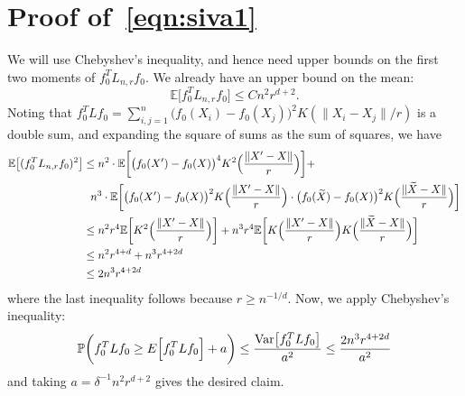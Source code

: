 \documentclass{article}
\newcommand{\Var}{\mathrm{Var}}
\newcommand{\1}{\mathbf{1}}
\newcommand{\Lap}{L}
\newcommand{\Pbb}{\mathbb{P}}
\newcommand{\Ebb}{\mathbb{E}}
\newcommand{\wt}[1]{\widetilde{#1}}
\theoremstyle{definition}
\theoremstyle{remark}
\begin{document}
\section{Proof of~\eqref{eqn:siva1}}
We will use Chebyshev's inequality, and hence need upper bounds on the first two moments of $f_0^T \Lap_{n,r} f_0$. We already have an upper bound on the mean:
\begin{equation*}
\Ebb\bigl[f_0^T \Lap_{n,r} f_0] \leq C n^2 r^{d + 2}.
\end{equation*}
Noting that $f_0^T \Lap f_0 = \sum_{i,j = 1}^{n} \bigl(f_0(X_i) - f_0(X_j)\bigr)^2 K(\|X_i - X_j\|/r)$ is a double sum, and expanding the square of sums as the sum of squares, we have
\begin{align*}
\Ebb\bigl[(f_0^T \Lap_{n,r} f_0)^2\bigr] & \leq n^2 \cdot \Ebb\biggl[\bigl(f_0(X') - f_0(X)\bigr)^4 K^2\Bigl(\frac{\|X' - X\|}{r}\Bigr)\biggr] + \\
&~~ n^3 \cdot \Ebb\biggl[\bigl(f_0(X') - f_0(X)\bigr)^2 K\Bigl(\frac{\|X' - X\|}{r}\Bigr) \cdot \bigl(f_0(\wt{X}) - f_0(X)\bigr)^2 K\Bigl(\frac{\|\wt{X} - X\|}{r}\Bigr)\biggr]\\
& \leq n^2 r^4 \Ebb\biggl[K^2\Bigl(\frac{\|X' - X\|}{r}\Bigr)\biggr] + n^3 r^{4}  \Ebb\biggl[K\Bigl(\frac{\|X' - X\|}{r}\Bigr) K\Bigl(\frac{\|\wt{X} - X\|}{r}\Bigr)\biggr] \\
& \leq n^2 r^{4 + d} + n^3r^{4 + 2d} \\
& \leq 2 n^3 r^{4 + 2d}
\end{align*}
where the last inequality follows because $r \geq n^{-1/d}$. Now, we apply Chebyshev's inequality:
\begin{equation*}
\Pbb\biggl(f_0^T \Lap f_0 \geq E\Bigl[f_0^T \Lap f_0\Bigr] + a\biggr) \leq \frac{\Var\bigl[f_0^T \Lap f_0\bigr]}{a^2} \leq \frac{2n^3r^{4 + 2d}}{a^2}
\end{equation*}
and taking $a = \delta^{-1}n^2r^{d + 2}$ gives the desired claim.
\end{document}
